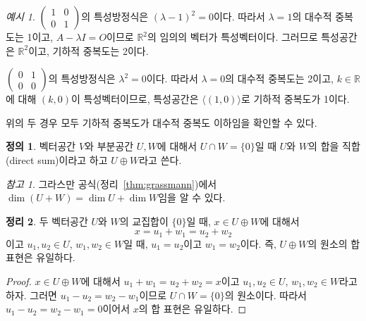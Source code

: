 \documentclass[unfonts,oneside,a4paper]{oblivoir}
\theoremstyle{definition}
\newtheorem{definition}{정의}[section]
\theoremstyle{theorem}
\newtheorem{theorem}[definition]{정리}
\theoremstyle{theorem}
\theoremstyle{remark}
\newtheorem*{remark}{참고}
\theoremstyle{remark}
\theoremstyle{remark}
\newtheorem*{example}{예시}
\theoremstyle{remark}
\renewcommand{\vec}[1]{\bm{\mathit{#1}}}
\newcommand{\vecz}{\bm{\mathrm{0}}}
\begin{document}
\begin{example}
    $\begin{pmatrix}1 & 0\\0 & 1\end{pmatrix}$의 특성방정식은 $(\lambda - 1)^2 = 0$이다.
    따라서 $\lambda = 1$의 대수적 중복도는 1이고, $A - \lambda I = O$이므로 $\mathbb R^2$의 임의의 벡터가 특성벡터이다.
    그러므로 특성공간은 $\mathbb R^2$이고, 기하적 중복도는 2이다.

    $\begin{pmatrix}0 & 1\\0 & 0\end{pmatrix}$의 특성방정식은 $\lambda^2 = 0$이다.
    따라서 $\lambda = 0$의 대수적 중복도는 2이고, $k \in \mathbb R$에 대해 $(k, 0)$이 특성벡터이므로, 특성공간은 $\langle (1, 0) \rangle$로 기하적 중복도가 1이다.

    위의 두 경우 모두 기하적 중복도가 대수적 중복도 이하임을 확인할 수 있다.
\end{example}

\begin{definition}
    벡터공간 $V$와 부분공간 $U, W$에 대해서 $U \cap W = \{\vecz\}$일 때 $U$와 $W$의 합을 직합(direct sum)이라고 하고 $U \oplus W$라고 쓴다.
\end{definition}

\begin{remark}
    그라스만 공식(정리~\ref{thm:grassmann})에서 $\dim (U + W) = \dim U + \dim W$임을 알 수 있다.
\end{remark}

\begin{theorem}
    두 벡터공간 $U$와 $W$의 교집합이 $\{\vecz\}$일 때, $\vec x \in U \oplus W$에 대해서
    \begin{equation*}
        \vec x = \vec u_1 + \vec w_1 = \vec u_2 + \vec w_2
    \end{equation*}
    이고 $\vec u_1, \vec u_2 \in U$, $\vec w_1, \vec w_2 \in W$일 때, $\vec u_1 = \vec u_2$이고 $\vec w_1 = \vec w_2$이다.
    즉, $U \oplus W$의 원소의 합 표현은 유일하다.
\end{theorem}

\begin{proof}
    $\vec x \in U \oplus W$에 대해서 $\vec u_1 + \vec w_1 = \vec u_2 + \vec w_2 = \vec x$이고 $\vec u_1, \vec u_2 \in U$, $\vec w_1, \vec w_2 \in W$라고 하자.
    그러면 $\vec u_1 - \vec u_2 = \vec w_2 - \vec w_1$이므로 $U \cap W = \{\vecz\}$의 원소이다.
    따라서 $\vec u_1 - \vec u_2 = \vec w_2 - \vec w_1 = \vecz$이어서 $\vec x$의 합 표현은 유일하다.
\end{proof}
\end{document}
